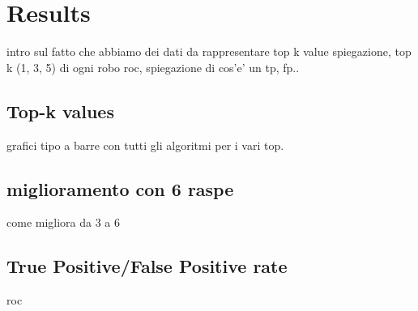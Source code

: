 \section{Results}

intro sul fatto che abbiamo dei dati da rappresentare
top k value spiegazione, top k (1, 3, 5) di ogni robo
roc, spiegazione di cos'e' un tp, fp..

\subsection{Top-k values}
grafici tipo a barre con tutti gli algoritmi per i vari top.


\subsection{miglioramento con 6 raspe}
come migliora da 3 a 6


\subsection{True Positive/False Positive rate}
roc

